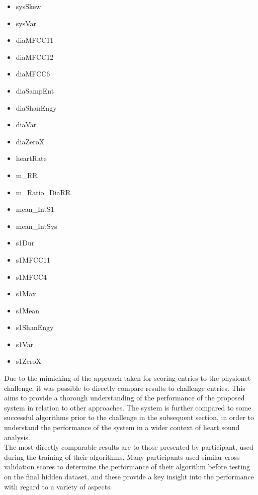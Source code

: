 \documentclass[titlepage, 12pt]{scrartcl} \usepackage{enumitem}
\begin{document}
\begin{table}[H]
\begin{multicols}{5}
\begin{itemize}
    \item sysSkew
    \item sysVar
    \item diaMFCC11
    \item diaMFCC12
    \item diaMFCC6
    \item diaSampEnt
    \item diaShanEngy
    \item diaVar
    \item diaZeroX
    \item heartRate
    \item m\_RR
    \item m\_Ratio\_DiaRR
    \item mean\_IntS1
    \item mean\_IntSys
    \item s1Dur
    \item s1MFCC11
    \item s1MFCC4
    \item s1Max
    \item s1Mean
    \item s1ShanEngy
    \item s1Var
    \item s1ZeroX
\end{itemize}
\end{multicols}
\end{table}

Due to the mimicking of the approach taken for scoring entries to the physionet
challenge, it was possible to directly compare results to challenge entries.
This aims to provide a thorough understanding of the performance of the
proposed system in relation to other approaches. The system is further compared
to some successful algorithms prior to the challenge in the subsequent section,
in order to understand the performance of the system in a wider context of
heart sound analysis.\\

The most directly comparable results are to those presented by participant,
used during the training of their algorithms. Many participants used similar
cross-validation scores to determine the performance of their algorithm before
testing on the final hidden dataset, and these provide a key insight into the
performance with regard to a variety of aspects.\\
\end{document}
